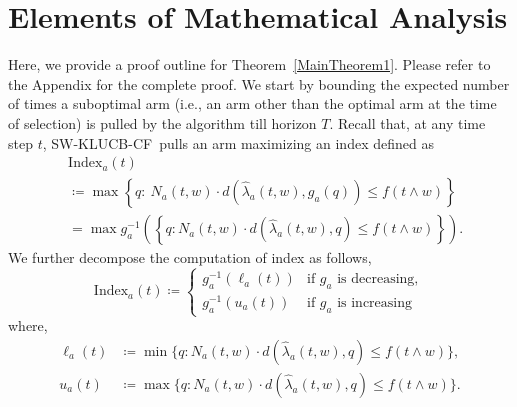 \documentclass[letterpaper]{article} %
\newcommand{\defined}{\coloneqq}
\newcommand{\SWKLUCBCF}{\textsc{SW-KLUCB-CF}}
\newcommand{\windowsize}{w}
\begin{document}
\section{Elements of Mathematical Analysis}
Here, we provide a proof outline for Theorem~\ref{MainTheorem1}. Please refer to the Appendix for the complete proof.  We start by bounding the expected number of times a suboptimal arm (i.e., an arm other than the optimal arm at the time of selection) is pulled by the algorithm till horizon $T$. Recall that, at any time step $t$, \SWKLUCBCF \ pulls an arm maximizing an index defined as
\begin{align*}
& \mathrm{Index}_a(t) \\
&\defined \max \left\{ q:\  N_a(t, \windowsize)\cdot{}d\left(\hat{\lambda}_a(t, \windowsize), g_a(q)\right) \leq f\left(t \wedge \windowsize\right) \right\} \\
&= \max g_a^{-1}\left( \left\{q: N_a(t, \windowsize)\cdot{}d\left(\hat{\lambda}_a(t, \windowsize), q\right) \leq f\left(t \wedge \windowsize\right)\right\} \right).
\end{align*}
We further decompose the computation of index as follows,
$$\mathrm{Index}_a(t) \defined
\begin{cases}
g_a^{-1}({\ell_a(t)}) & \text{if } g_a \text{ is decreasing}, \\
g_a^{-1}({u_a(t)}) & \text{if } g_a \text{ is increasing}
\end{cases}  $$
where,
\begin{align*}
\ell_a(t)  &\defined  \min \Big\{q: N_a(t, \windowsize)\cdot{}d\left(\hat{\lambda}_a(t, \windowsize), q\right) \leq f\left( t \wedge \windowsize \right)\Big\}, \\
u_a(t)  &\defined  \max \Big\{q: N_a(t, \windowsize)\cdot{}d\left(\hat{\lambda}_a(t, \windowsize), q\right) \leq f\left( t \wedge\windowsize \right) \Big\}.
\end{align*}
\end{document}
